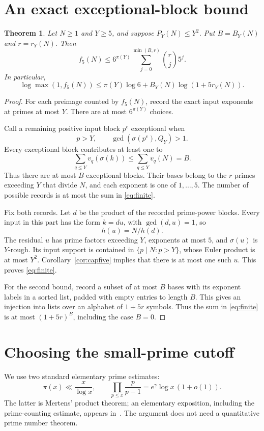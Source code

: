 \documentclass[11pt]{article}
\newtheorem{theorem}{Theorem}[section]
\begin{document}
\section{An exact exceptional-block bound}
\begin{theorem}\label{thm:finite}
Let $N\ge1$ and $Y\ge5$, and suppose $P_Y(N)\le Y^2$. Put $B=B_Y(N)$ and $r=r_Y(N)$. Then
\begin{equation}\label{eq:finite}
 \boxed{f_5(N)\le6^{\pi(Y)}
 \sum_{j=0}^{\min(B,r)}\binom{r}{j}5^j.}
\end{equation}
In particular,
\begin{equation}\label{eq:coarsefinite}
 \boxed{\log\max(1,f_5(N))
 \le\pi(Y)\log6+B_Y(N)\log(1+5r_Y(N)).}
\end{equation}
\end{theorem}
\begin{proof}
For each preimage counted by $f_5(N)$, record the exact input exponents at primes at most $Y$. There are at most $6^{\pi(Y)}$ choices.

Call a remaining positive input block $p^e$ exceptional when
\[
 p>Y,\qquad \gcd(\sigma(p^e),Q_Y)>1.
\]
Every exceptional block contributes at least one to
\[
 \sum_{q\le Y}v_q(\sigma(k))\le\sum_{q\le Y}v_q(N)=B.
\]
Thus there are at most $B$ exceptional blocks. Their bases belong to the $r$ primes exceeding $Y$ that divide $N$, and each exponent is one of $1,\ldots,5$. The number of possible records is at most the sum in \eqref{eq:finite}.

Fix both records. Let $d$ be the product of the recorded prime-power blocks. Every input in this part has the form $k=du$, with $\gcd(d,u)=1$, so
\[
 h(u)=N/h(d).
\]
The residual $u$ has prime factors exceeding $Y$, exponents at most $5$, and $\sigma(u)$ is $Y$-rough. Its input support is contained in $\{p\mid N:p>Y\}$, whose Euler product is at most $Y^2$. Corollary~\ref{cor:capfive} implies that there is at most one such $u$. This proves \eqref{eq:finite}.

For the second bound, record a subset of at most $B$ bases with its exponent labels in a sorted list, padded with empty entries to length $B$. This gives an injection into lists over an alphabet of $1+5r$ symbols. Thus the sum in \eqref{eq:finite} is at most $(1+5r)^B$, including the case $B=0$.
\end{proof}

\section{Choosing the small-prime cutoff}
We use two standard elementary prime estimates:
\begin{equation}\label{eq:mertens}
 \pi(x)\ll\frac{x}{\log x},\qquad
 \prod_{p\le x}\frac{p}{p-1}=e^\gamma\log x\,(1+o(1)).
\end{equation}
The latter is Mertens' product theorem; an elementary exposition, including the prime-counting estimate, appears in~\cite{teitler}. The argument does not need a quantitative prime number theorem.
\end{document}
